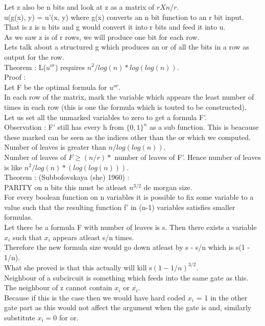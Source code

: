 \documentclass[solution,addpoints,12pt]{exam}
\begin{document}
Let z also be n bits and look at z as a matrix of $rXn/r$.\\
u(g(x), y) = u'(x, y) where g(x) converts an n bit function
to an r bit input. That is z is n bits and g would convert it
into r bits and feed it into u.\\

As we saw z is of r rows, we will produce one bit for each row.\\
Lets talk about a structured g which produces an or of all
the bits in a row as output for the row.\\
Theorem : L($u^{or}$) requires $n^2/log(n)*log(log(n))$.\\
Proof :\\
Let F be the optimal formula for $u^{or}$.\\
In each row of the matrix, mark the variable which
appears the least number of times in each row (this is one
the formula which is touted to be constructed).\\
Let us set all the unmarked variables to zero to get a formula
F'.\\
Observation : F' still has every h from ${\{0, 1\}}^n$
as a sub function. This is beacause these marked can be seen
as the indices other than the or which we computed.\\
Number of leaves is greater than $n/log(log(n))$.\\
Number of leaves of $F \ge (n/r)*$ number of
leaves of F'. Hence number of leaves is like $n^2/log(n)*(log(log(n)))$.\\

Theorem : (Subbofovskaya (she) 1960) :\\
PARITY on n bits this must be atleast $n^{3/2}$ de morgan size.\\
For every boolean function on n variables it is possible
to fix some variable to a value such that the resulting function
f' in (n-1) variables satisfies smaller formulas.\\
Let there be a formula F with number of leaves is s. Then there
exists a variable $x_i$ such that $x_i$ appears atleast s/n times.\\
Therefore the new formula size would go down atleast by s - s/n
which is s(1 - 1/n).\\
What she proved is that this actually will kill s${(1 - 1/n)}^{3/2}$.\\
Neighbour of a subcircuit is something which feeds into
the same gate as this.\\
The neighbour of z cannot contain $x_i$ or $\overline{x_i}$.\\
Because if this is the case then we would have hard coded
$x_i$ = 1 in the other gate part as this would not affect the argument
when the gate is and, similarly substitute $x_i = 0$ for or.\\
\end{document}
